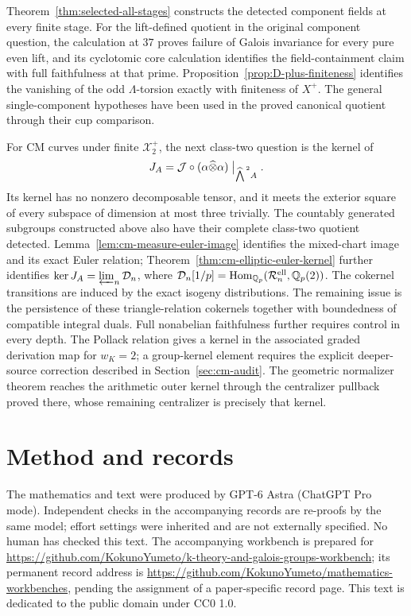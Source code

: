 \documentclass[11pt]{article}
\theoremstyle{definition}\newtheorem{definition}[theorem]{Definition}
\newcommand{\workbenchurl}{https://github.com/KokunoYumeto/k-theory-and-galois-groups-workbench}
\newcommand{\recordurl}{https://github.com/KokunoYumeto/mathematics-workbenches}
\begin{document}
Theorem~\ref{thm:selected-all-stages} constructs the detected component fields at every finite stage. For the lift-defined quotient in the original component question, the calculation at $37$ proves failure of Galois invariance for every pure even lift, and its cyclotomic core calculation identifies the field-containment claim with full faithfulness at that prime. Proposition~\ref{prop:D-plus-finiteness} identifies the vanishing of the odd $\Lambda$-torsion exactly with finiteness of $X^+$. The general single-component hypotheses have been used in the proved canonical quotient through their cup comparison.

For CM curves under finite $\mathcal X_2^+$, the next class-two question is the kernel of
\[
 J_A=\mathcal J\circ(\alpha\widehat\otimes\alpha)
           \bigm|_{\widehat{\bigwedge}^{\,2}A}.
\]
Its kernel has no nonzero decomposable tensor, and it meets the exterior square of every subspace of dimension at most three trivially. The countably generated subgroups constructed above also have their complete class-two quotient detected. Lemma~\ref{lem:cm-measure-euler-image} identifies the mixed-chart image and its exact Euler relation; Theorem~\ref{thm:cm-elliptic-euler-kernel} further identifies
\(\ker J_A=\varprojlim_n\mathcal D_n\), where
\(\mathcal D_n[1/p]=\operatorname{Hom}_{\mathbb Q_p}
(\mathcal R_n^{\rm ell},\mathbb Q_p(2))\).
The cokernel transitions are induced by the exact isogeny distributions.
The remaining issue is the persistence of these triangle-relation
cokernels together with boundedness of compatible integral duals. Full nonabelian faithfulness further requires control in every depth. The Pollack relation gives a kernel in the associated graded derivation map for $w_K=2$; a group-kernel element requires the explicit deeper-source correction described in Section~\ref{sec:cm-audit}. The geometric normalizer theorem reaches the arithmetic outer kernel through the centralizer pullback proved there, whose remaining centralizer is precisely that kernel.

\section*{Method and records}
The mathematics and text were produced by GPT-6 Astra (ChatGPT Pro mode). Independent checks in the accompanying records are re-proofs by the same model; effort settings were inherited and are not externally specified. No human has checked this text. The accompanying workbench is prepared for \url{\workbenchurl}; its permanent record address is \url{\recordurl}, pending the assignment of a paper-specific record page. This text is dedicated to the public domain under CC0 1.0.
\end{document}
